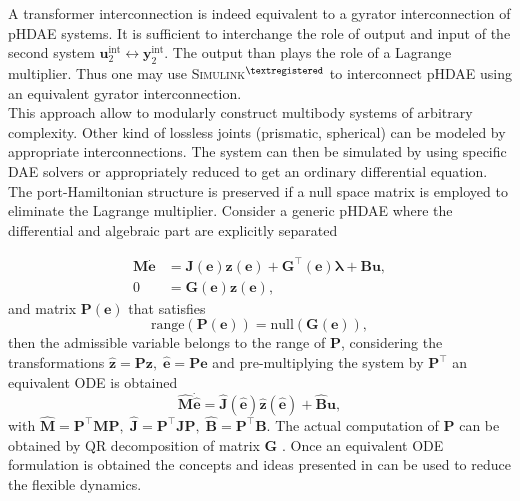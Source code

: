 \documentclass{svjour3}                     %
\begin{document}
A transformer interconnection is indeed equivalent to a gyrator interconnection of pHDAE systems. It is sufficient to interchange the role of output and input of the second system $\bm{u}_2^{\text{int}} \leftrightarrow \bm{y}_2^{\text{int}}$. The output than plays the role of a Lagrange multiplier.  Thus one may use \textsc{Simulink}$^{\tiny{\textregistered}}$ to interconnect pHDAE using an equivalent gyrator interconnection. \\
 
This approach allow to modularly construct multibody systems of arbitrary complexity. Other kind of lossless joints (prismatic, spherical) can be modeled by appropriate interconnections. The system can then be simulated by using specific DAE solvers \cite{daePetzold} or appropriately reduced to get an ordinary differential equation. The port-Hamiltonian structure is preserved if a null space matrix is employed to eliminate the Lagrange multiplier. Consider a generic pHDAE where the differential and algebraic part are explicitly separated

\begin{equation}
\begin{aligned}
\bm{M} \dot{\bm{e}} &=  \bm{J}(\bm{e})\bm{z}(\bm{e}) + \bm{G}^\top(\bm{e}) \bm{\lambda} + \bm{B}\bm{u}, \\ 
0 &= \bm{G}(\bm{e})\bm{z}(\bm{e}),
\end{aligned}
\end{equation}
and matrix $\bm{P}(\bm{e})$ that satisfies 
\[
\mathrm{range}(\bm{P}(\bm{e})) = \mathrm{null}(\bm{G}(\bm{e})),
\]
then the admissible variable belongs to the range of $\bm{P}$, considering the transformations $\widehat{\bm{z}} = \bm{P} \bm{z}, \; \widehat{\bm{e}} = \bm{P} \bm{e}$ and pre-multiplying the system by $\bm{P}^\top$ an equivalent ODE is obtained
\[
\widehat{\bm{M}} \dot{\widehat{\bm{e}}} =  \widehat{\bm{J}}(\widehat{\bm{e}})\widehat{\bm{z}}(\widehat{\bm{e}}) + \widehat{\bm{B}}\bm{u},
\]
with $\widehat{\bm{M}} = \bm{P}^\top \bm{M} \bm{P}, \; \widehat{\bm{J}} = \bm{P}^\top \bm{J} \bm{P}, \; \widehat{\bm{B}} = \bm{P}^\top \bm{B}$. The actual computation of $\bm{P}$ can be obtained by QR decomposition of matrix $\bm{G}$ \cite{nullspaceFlMult}. Once an equivalent ODE formulation is obtained the concepts and ideas presented in \cite{phode_red} can be used to reduce the flexible dynamics.
\end{document}
